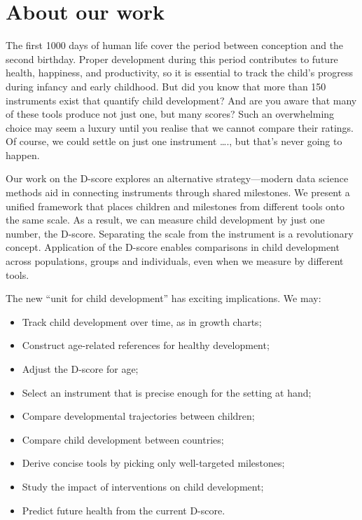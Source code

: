 \documentclass[
]{book}
\providecommand{\tightlist}{%
  \setlength{\itemsep}{0pt}\setlength{\parskip}{0pt}}
\begin{document}
\hypertarget{about-our-work}{%
\section*{About our work}\label{about-our-work}}

The first 1000 days of human life cover the period between conception and the second birthday. Proper development during this period contributes to future health, happiness, and productivity, so it is essential to track the child's progress during infancy and early childhood.
But did you know that more than 150 instruments exist that quantify child development? And are you aware that many of these tools produce not just one, but many scores? Such an overwhelming choice may seem a luxury until you realise that we cannot compare their ratings. Of course, we could settle on just one instrument \ldots., but that's never going to happen.

Our work on the D-score explores an alternative strategy---modern data science methods aid in connecting instruments through shared milestones. We present a unified framework that places children and milestones from different tools onto the same scale. As a result, we can measure child development by just one number, the D-score. Separating the scale from the instrument is a revolutionary concept. Application of the D-score enables comparisons in child development across populations, groups and individuals, even when we measure by different tools.

The new ``unit for child development'' has exciting implications. We may:

\begin{itemize}
\tightlist
\item
  Track child development over time, as in growth charts;
\item
  Construct age-related references for healthy development;
\item
  Adjust the D-score for age;
\item
  Select an instrument that is precise enough for the setting at hand;
\item
  Compare developmental trajectories between children;
\item
  Compare child development between countries;
\item
  Derive concise tools by picking only well-targeted milestones;
\item
  Study the impact of interventions on child development;
\item
  Predict future health from the current D-score.
\end{itemize}
\end{document}
